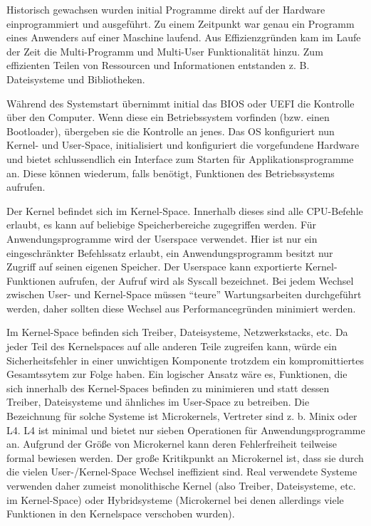 Historisch gewachsen wurden initial Programme direkt auf der Hardware einprogrammiert und ausgeführt. Zu einem Zeitpunkt war genau ein Programm eines Anwenders auf einer Maschine laufend. Aus Effizienzgründen kam im Laufe der Zeit die Multi-Programm und Multi-User Funktionalität hinzu. Zum effizienten Teilen von Ressourcen und Informationen entstanden z. B. Dateisysteme und Bibliotheken.

Während des Systemstart übernimmt initial das BIOS oder UEFI die Kontrolle über den Computer. Wenn diese ein Betriebssystem vorfinden (bzw. einen Bootloader), übergeben sie die Kontrolle an jenes. Das OS konfiguriert nun Kernel- und User-Space, initialisiert und konfiguriert die vorgefundene Hardware und bietet schlussendlich ein Interface zum Starten für Applikationsprogramme an. Diese können wiederum, falls benötigt, Funktionen des Betriebssystems aufrufen.

Der Kernel befindet sich im Kernel-Space. Innerhalb dieses sind alle CPU-Befehle erlaubt, es kann auf beliebige Speicherbereiche zugegriffen werden. Für Anwendungsprogramme wird der Userspace verwendet. Hier ist nur ein eingeschränkter Befehlssatz erlaubt, ein Anwendungsprogramm besitzt nur Zugriff auf seinen eigenen Speicher. Der Userspace kann exportierte Kernel-Funktionen aufrufen, der Aufruf wird als Syscall bezeichnet. Bei jedem Wechsel zwischen User- und Kernel-Space müssen ``teure'' Wartungsarbeiten durchgeführt werden, daher sollten diese Wechsel aus Performancegründen minimiert werden.

Im Kernel-Space befinden sich Treiber, Dateisysteme, Netzwerkstacks, etc. Da jeder Teil des Kernelspaces auf alle anderen Teile zugreifen kann, würde ein Sicherheitsfehler in einer unwichtigen Komponente trotzdem ein kompromittiertes Gesamtssytem zur Folge haben. Ein logischer Ansatz wäre es, Funktionen, die sich innerhalb des Kernel-Spaces befinden zu minimieren und statt dessen Treiber, Dateisysteme und ähnliches im User-Space zu betreiben. Die Bezeichnung für solche Systeme ist Microkernels, Vertreter sind z. b. Minix oder L4. L4 ist minimal und bietet nur sieben Operationen für Anwendungsprogramme an. Aufgrund der Größe von Microkernel kann deren Fehlerfreiheit teilweise formal bewiesen werden. Der große Kritikpunkt an Microkernel ist, dass sie durch die vielen User-/Kernel-Space Wechsel ineffizient sind. Real verwendete Systeme verwenden daher zumeist monolithische Kernel (also Treiber, Dateisysteme, etc. im Kernel-Space) oder Hybridsysteme (Microkernel bei denen allerdings viele Funktionen in den Kernelspace verschoben wurden).

